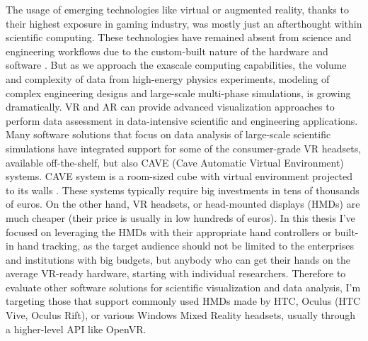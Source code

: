 The usage of emerging technologies like virtual or augmented reality, thanks to their highest exposure in gaming industry, was mostly just an afterthought within scientific computing. These technologies have remained absent from science and engineering workflows due to the custom-built nature of the hardware and software \citep{suVirtualAugmentedReality2020}. But as we approach the exascale computing capabilities, the volume and complexity of data from high-energy physics experiments, modeling of complex engineering designs and large-scale multi-phase simulations, is growing dramatically. VR and AR can provide advanced visualization approaches to perform data assessment in data-intensive scientific and engineering applications. Many software solutions that focus on data analysis of large-scale scientific simulations have integrated support for some of the consumer-grade VR headsets, available off-the-shelf, but also CAVE (Cave Automatic Virtual Environment) systems. CAVE system is a room-sized cube with virtual environment projected to its walls \citep{ohnoIntroductionVirtualReality}. These systems typically require big investments in tens of thousands of euros. On the other hand, VR headsets, or head-mounted displays (HMDs) are much cheaper (their price is usually in low hundreds of euros). In this thesis I've focused on leveraging the HMDs with their appropriate hand controllers or built-in hand tracking, as the target audience should not be limited to the enterprises and institutions with big budgets, but anybody who can get their hands on the average VR-ready hardware, starting with individual researchers. Therefore to evaluate other software solutions for scientific visualization and data analysis, I'm targeting those that support commonly used HMDs made by HTC, Oculus (HTC Vive, Oculus Rift), or various Windows Mixed Reality headsets, usually through a higher-level API like OpenVR. 

